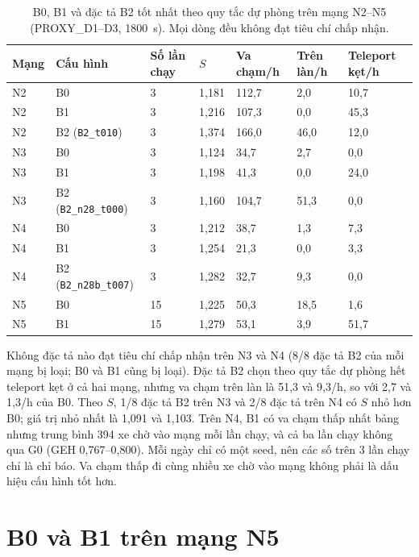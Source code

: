 \documentclass[../main.tex]{subfiles}
\begin{document}
\begin{table}[!htbp]
\centering
\small
\setlength{\tabcolsep}{3pt}
\caption{B0, B1 và đặc tả B2 tốt nhất theo quy tắc dự phòng trên mạng N2--N5 (PROXY\_D1--D3, 1800~s). Mọi dòng đều không đạt tiêu chí chấp nhận.} \label{table:4.nets_results}
\begin{tabular}{|p{1.2cm}|>{\raggedright\arraybackslash}p{3.5cm}|p{1.2cm}|p{1.1cm}|p{1.6cm}|p{1.8cm}|p{1.6cm}|}
\hline
\textbf{Mạng} & \textbf{Cấu hình} & \textbf{Số lần chạy} & \textbf{$S$} & \textbf{Va chạm/h} & \textbf{Trên làn/h} & \textbf{Teleport kẹt/h} \\ \hline
N2 & B0 & 3 & 1,181 & 112,7 & 2,0 & 10,7 \\ \hline
N2 & B1 & 3 & 1,216 & 107,3 & 0,0 & 45,3 \\ \hline
N2 & B2 (\texttt{B2\_t010}) & 3 & 1,374 & 166,0 & 46,0 & 12,0 \\ \hline
N3 & B0 & 3 & 1,124 & 34,7 & 2,7 & 0,0 \\ \hline
N3 & B1 & 3 & 1,198 & 41,3 & 0,0 & 24,0 \\ \hline
N3 & B2 (\texttt{B2\_n28\_t000}) & 3 & 1,160 & 104,7 & 51,3 & 0,0 \\ \hline
N4 & B0 & 3 & 1,212 & 38,7 & 1,3 & 7,3 \\ \hline
N4 & B1 & 3 & 1,254 & 21,3 & 0,0 & 3,3 \\ \hline
N4 & B2 (\texttt{B2\_n28b\_t007}) & 3 & 1,282 & 32,7 & 9,3 & 0,0 \\ \hline
N5 & B0 & 15 & 1,225 & 50,3 & 18,5 & 1,6 \\ \hline
N5 & B1 & 15 & 1,279 & 53,1 & 3,9 & 51,7 \\ \hline
\end{tabular}
\end{table}

Không đặc tả nào đạt tiêu chí chấp nhận trên N3 và N4 (8/8 đặc tả B2 của mỗi mạng bị loại; B0 và B1 cũng bị loại). Đặc tả B2 chọn theo quy tắc dự phòng hết teleport kẹt ở cả hai mạng, nhưng va chạm trên làn là 51,3 và 9,3/h, so với 2,7 và 1,3/h của B0. Theo $S$, 1/8 đặc tả B2 trên N3 và 2/8 đặc tả trên N4 có $S$ nhỏ hơn B0; giá trị nhỏ nhất là 1,091 và 1,103. Trên N4, B1 có va chạm thấp nhất bảng nhưng trung bình 394 xe chờ vào mạng mỗi lần chạy, và cả ba lần chạy không qua G0 (GEH 0,767--0,800). Mỗi ngày chỉ có một seed, nên các số trên 3 lần chạy chỉ là chỉ báo. Va chạm thấp đi cùng nhiều xe chờ vào mạng không phải là dấu hiệu cấu hình tốt hơn.

\section{B0 và B1 trên mạng N5}
\label{subsection:ref_n29}
\end{document}

